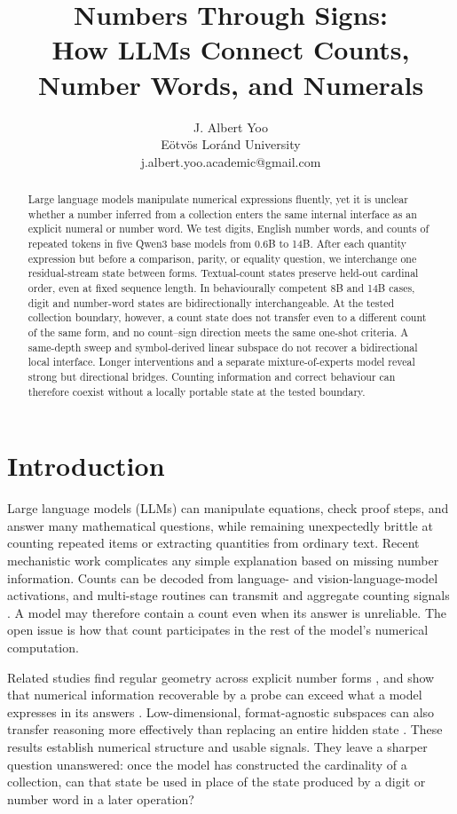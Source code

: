 \documentclass[11pt]{article}
\title{Numbers Through Signs:\\
How LLMs Connect Counts, Number Words, and Numerals}
\author{J. Albert Yoo \\
  {\normalsize E\"otv\"os Lor\'and University} \\
  {\small j.albert.yoo.academic@gmail.com}}
\begin{document}
\maketitle

\begin{abstract}

Large language models manipulate numerical expressions fluently, yet it is
unclear whether a number inferred from a collection enters the same internal
interface as an explicit numeral or number word. We test digits, English
number words, and counts of repeated tokens in five Qwen3 base models from
0.6B to 14B. After each quantity expression but before a comparison, parity,
or equality question, we interchange one residual-stream state between
forms. Textual-count states preserve held-out cardinal order, even at fixed
sequence length. In behaviourally competent 8B and 14B cases, digit and
number-word states are bidirectionally interchangeable. At the tested
collection boundary, however, a count state does not transfer even to a
different count of the same form, and no count--sign direction meets the
same one-shot criteria. A same-depth sweep and symbol-derived linear subspace
do not recover a bidirectional local interface. Longer interventions and a
separate mixture-of-experts model reveal strong but directional bridges.
Counting information and correct behaviour can therefore coexist without a
locally portable state at the tested boundary.
\end{abstract}

\section{Introduction}


Large language models (LLMs) can manipulate equations, check proof steps, and
answer many mathematical questions, while remaining unexpectedly brittle at
counting repeated items or extracting quantities from ordinary text. Recent
mechanistic work complicates any simple explanation based on missing number
information. Counts can be decoded from language- and vision-language-model
activations, and multi-stage routines can transmit and aggregate counting
signals \citep{hasani2026counting,hasani2026system2}. A model may therefore
contain a count even when its answer is unreliable. The open issue is how that
count participates in the rest of the model's numerical computation.


Related studies find regular geometry across explicit number forms
\citep{stefanik2026universal}, and show that numerical information recoverable
by a probe can exceed what a model expresses in its answers
\citep{yuchi2026numbers}. Low-dimensional, format-agnostic subspaces can also
transfer reasoning more effectively than replacing an entire hidden state
\citep{yuan2026fars}. These results establish numerical structure and usable
signals. They leave a sharper question unanswered: once the model has
constructed the cardinality of a collection, can that state be used in place
of the state produced by a digit or number word in a later operation?
\end{document}

